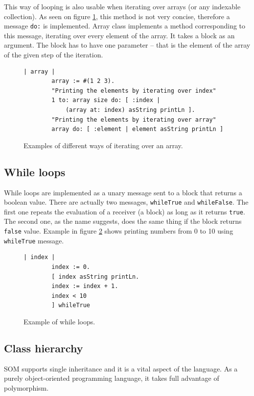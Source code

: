 \documentclass[thesis=M,english]{FITthesis}[2019/12/23]
\begin{document}
This way of looping is also usable when iterating over arrays (or any indexable collection). As seen on figure \ref{lst-for-array}, this method is not
very concise, therefore a message \texttt{do:} is implemented. Array class implements a method corresponding to this message, iterating
over every element of the array. It takes a block as an argument. The block has to have one parameter -- that is the element of the array
of the given step of the iteration.

\begin{figure}[h!]
	\begin{lstlisting}[language=Smalltalk]
		| array |
		array := #(1 2 3).
		"Printing the elements by iterating over index"
		1 to: array size do: [ :index |
			(array at: index) asString printLn ].
		"Printing the elements by iterating over array"
		array do: [ :element | element asString printLn ]
	\end{lstlisting}
	\caption{Examples of different ways of iterating over an array.}
	\label{lst-for-array}
\end{figure}

\subsection{While loops}
While loops are implemented as a unary message sent to a block that returns a boolean value. There are actually
two messages, \texttt{whileTrue} and \texttt{whileFalse}. The first one repeats the evaluation of a receiver (a block)
as long as it returns \texttt{true}. The second one, as the name suggests, does the same thing if the block returns
\texttt{false} value. Example in figure \ref{lst-while} shows printing numbers from 0 to 10 using \texttt{whileTrue}
message.

\begin{figure}[h!]
	\begin{lstlisting}[language=Smalltalk]
		| index |
		index := 0.
		[ index asString printLn.
		index := index + 1.
		index < 10
		] whileTrue
	\end{lstlisting}
	\caption{Example of while loops.}
	\label{lst-while}
\end{figure}

\subsection{Class hierarchy}
SOM supports single inheritance and it is a vital aspect of the language. As a purely object-oriented programming language,
it takes full advantage of polymorphism.
\end{document}
